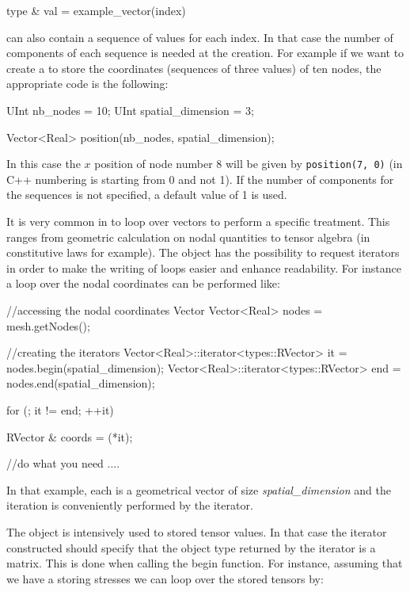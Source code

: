 \begin{cpp}
  type & val = example_vector(index)
\end{cpp}

 can also contain a
sequence of values for each index. In that case the number of components
of each sequence is needed at the  creation.
For example if we want to create a  to store
the coordinates (sequences of three values) of ten nodes, the appropriate
code is the following:
\begin{cpp}
  UInt nb_nodes = 10;
  UInt spatial_dimension = 3;

  Vector<Real> position(nb_nodes, spatial_dimension);
\end{cpp}
In this case the $x$ position of node number 8 will be given by
\texttt{position(7, 0)} (in C++ numbering is starting from 0 and not
1). If the number of components for the sequences is not specified, a
default value of 1 is used.

It is very common in \akantu to loop over vectors to perform a specific
treatment. This ranges from geometric calculation on nodal quantities
to tensor algebra (in constitutive laws for example).
The  object has the possibility to request iterators
in order to make the writing of loops easier and enhance readability.
For instance a loop over the nodal coordinates can be performed like:
\begin{cpp}
  //accessing the nodal coordinates Vector
  Vector<Real> nodes = mesh.getNodes();

  //creating the iterators
  Vector<Real>::iterator<types::RVector> it  = nodes.begin(spatial_dimension);
  Vector<Real>::iterator<types::RVector> end = nodes.end(spatial_dimension);

  for (; it != end; ++it){
    RVector & coords = (*it);

    //do what you need
    ....

  }
\end{cpp}
In that example, each  is a geometrical vector of size \textit{spatial\_dimension}
and the iteration is conveniently performed by the  iterator.

The  object is intensively used to stored tensor values.
In that case the iterator constructed should specify that the object type
returned by the iterator is a matrix. This is done when calling the
begin function. For instance, assuming that we have a  storing
stresses we can loop over the stored tensors by:

